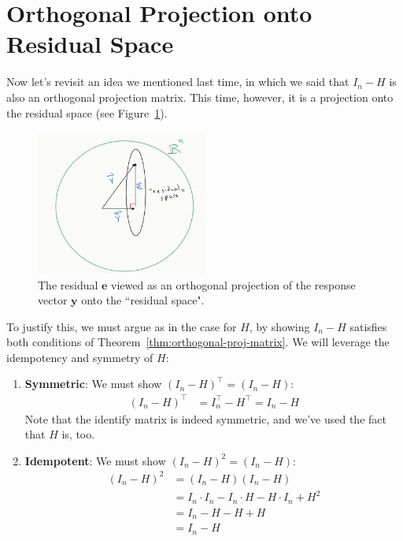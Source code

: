 \documentclass[12pt, a4paper]{article}
\theoremstyle{definition}
\begin{document}
	\section*{Orthogonal Projection onto Residual Space}
	Now let's revisit an idea we mentioned last time, in which we said that $I_n-H$ is
	also an orthogonal projection matrix. This time, however, it is a projection
	onto the residual space (see Figure~\ref{fig:residual-space}).
	\begin{figure}
		\centering
		\includegraphics[width=0.5\textwidth]{residual-space}
		\caption{The residual $\mathbf{e}$ viewed as an orthogonal
			projection of the response vector $\mathbf{y}$ onto the ``residual space".}
		\label{fig:residual-space}
	\end{figure}
	To justify this, we must argue as in the case for $H$, by showing $I_n-H$ satisfies
	both conditions of Theorem~\ref{thm:orthogonal-proj-matrix}. We will leverage
	the idempotency and symmetry of $H$:
	\begin{enumerate}[label=(\roman*)]
		\item \textbf{Symmetric}: We must show $(I_n-H)^\top=(I_n-H)$:
		\begin{align*}
			(I_n-H)^\top &=I_n^\top -H^\top=I_n-H
		\end{align*}
		Note that the identify matrix is indeed symmetric, and we've used the fact that $H$ is, too.
		\item \textbf{Idempotent}: We must show $(I_n-H)^2=(I_n-H)$:
		\begin{align*}
			(I_n-H)^2 &= (I_n-H)(I_n-H)\\
			&=I_n\cdot I_n - I_n\cdot H-H\cdot I_n+H^2\\
			&=I_n -H-H+H
			\tag{$H$ is idempotent}\\
			&=I_n-H
		\end{align*}
	\end{enumerate}
\end{document}
